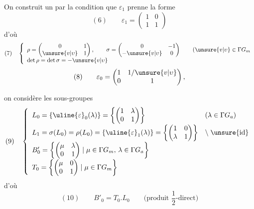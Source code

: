 On construit un 
par la condition que $\varepsilon_1$ prenne la forme
\[
(6)\qquad\varepsilon_1
 =\begin{pmatrix}1&0\\1&1\end{pmatrix}
\]
d'où
\[
(7)\quad\left\{\begin{array}{l}
\displaystyle\rho=\begin{pmatrix}0&1\\\unsure{v|\upsilon}&1\end{pmatrix},\qquad
 \sigma=\begin{pmatrix}0&-1\\-\unsure{v|\upsilon}&0\end{pmatrix}
 \qquad(\unsure{v|\upsilon}\in\Gamma G_m\\[6pt]
\det\rho=\det\sigma=-\unsure{v|\upsilon}
\end{array}\right.
\]
\[
(8)\qquad\varepsilon_0
 =\begin{pmatrix}1&1/\unsure{v|\upsilon}\\0&1\end{pmatrix},
\]



on considère les sous-groupes
\[
(9)\quad\left\{\begin{array}{ll}
 L_0=\{\uline{\varepsilon}_0(\lambda)\}
   =\left\{\begin{pmatrix}1&\lambda\\0&1\end{pmatrix}\right\}
 & (\lambda\in\Gamma G_a)\\[7pt]
 L_1=\sigma(L_0)=\rho(L_0)
   =\{\uline{\varepsilon}_1(\lambda)\}
   =\left\{\begin{pmatrix}1&0\\\lambda&1\end{pmatrix}\right\}
 & \backslash\;\unsure{\text{id}}\\[7pt]
 B'_0=\left\{\begin{pmatrix}\mu&\lambda\\0&1\end{pmatrix}
       \mid\mu\in\Gamma G_m,\,\lambda\in\Gamma G_a\right\} &\\[7pt]
 T_0=\left\{\begin{pmatrix}\mu&0\\0&1\end{pmatrix}
       \mid\mu\in\Gamma G_m\right\} &
\end{array}\right.
\]
d'où
\[
(10)\qquad B'_0=T_0.L_0\qquad\text{(produit $\frac12$-direct)}
\]
\margin{\unsure{---}}

